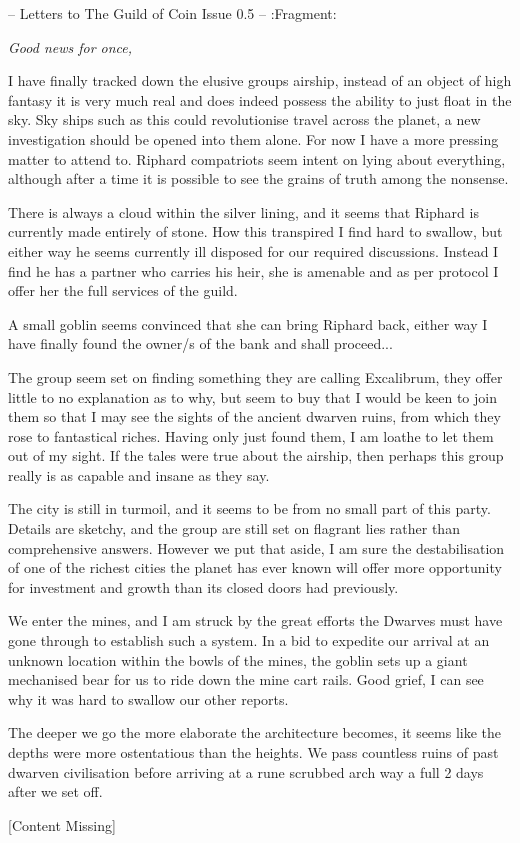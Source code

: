 -- Letters to The Guild of Coin Issue 0.5 -- :Fragment:\medskip
{\itshape
Good news for once,

I have finally tracked down the elusive groups airship, instead of an object of high fantasy it is very much real and does indeed possess the ability to just float in the sky. Sky ships such as this could revolutionise travel across the planet, a new investigation should be opened into them alone. For now I have a more pressing matter to attend to. Riphard compatriots seem intent on lying about everything, although after a time it is possible to see the grains of truth among the nonsense.

There is always a cloud within the silver lining, and it seems that Riphard is currently made entirely of stone. How this transpired I find hard to swallow, but either way he seems currently ill disposed for our required discussions. Instead I find he has a partner who carries his heir, she is amenable and as per protocol I offer her the full services of the guild.

A small goblin seems convinced that she can bring Riphard back, either way I have finally found the owner/s of the bank and shall proceed...

The group seem set on finding something they are calling Excalibrum, they offer little to no explanation as to why, but seem to buy that I would be keen to join them so that I may see the sights of the ancient dwarven ruins, from which they rose to fantastical riches. Having only just found them, I am loathe to let them out of my sight. If the tales were true about the airship, then perhaps this group really is as capable and insane as they say.

The city is still in turmoil, and it seems to be from no small part of this party. Details are sketchy, and the group are still set on flagrant lies rather than comprehensive answers. However we put that aside, I am sure the destabilisation of one of the richest cities the planet has ever known will offer more opportunity for investment and growth than its closed doors had previously.

We enter the mines, and I am struck by the great efforts the Dwarves must have gone through to establish such a system. In a bid to expedite our arrival at an unknown location within the bowls of the mines, the goblin sets up a giant mechanised bear for us to ride down the mine cart rails. Good grief, I can see why it was hard to swallow our other reports.

The deeper we go the more elaborate the architecture becomes, it seems like the depths were more ostentatious than the heights. We pass countless ruins of past dwarven civilisation before arriving at a rune scrubbed arch way a full 2 days after we set off.

[Content Missing]
}\medskip

